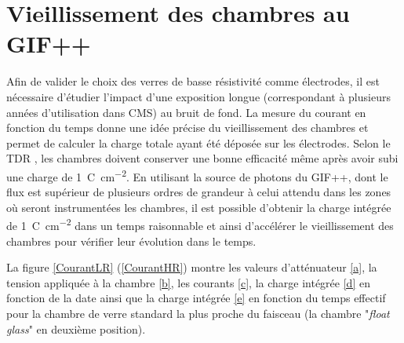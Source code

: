 \section{Vieillissement des chambres au GIF++}
\label{VIEE}
\vspace*{-0.4cm}
Afin de valider le choix des verres de basse résistivité comme électrodes, il est nécessaire d'étudier l'impact d'une exposition longue (correspondant à plusieurs années d'utilisation dans CMS) au bruit de fond. La mesure du courant en fonction du temps donne une idée précise du vieillissement des chambres et permet de calculer la charge totale ayant été déposée sur les électrodes. Selon le TDR \cite{Lourenco:2283189}, les chambres doivent conserver une bonne efficacité même après avoir subi une charge de \SI{1}{\coulomb\per\square\centi\meter}. En utilisant la source de photons du GIF++, dont le flux est supérieur de plusieurs ordres de grandeur à celui attendu dans les zones où seront instrumentées les chambres, il est possible d'obtenir la charge intégrée de \SI{1}{\coulomb\per\square\centi\meter} dans un temps raisonnable et ainsi d'accélérer le vieillissement des chambres pour vérifier leur évolution dans le temps.

La figure \ref{CourantLR} (\ref{CourantHR}) montre les valeurs d'atténuateur \ref{a}, la tension appliquée à la chambre \ref{b}, les courants \ref{c}, la charge intégrée \ref{d} en fonction de la date ainsi que la charge intégrée \ref{e} en fonction du temps effectif pour la chambre de verre standard la plus proche du faisceau (la chambre "\textit{float glass}" en deuxième position). 

